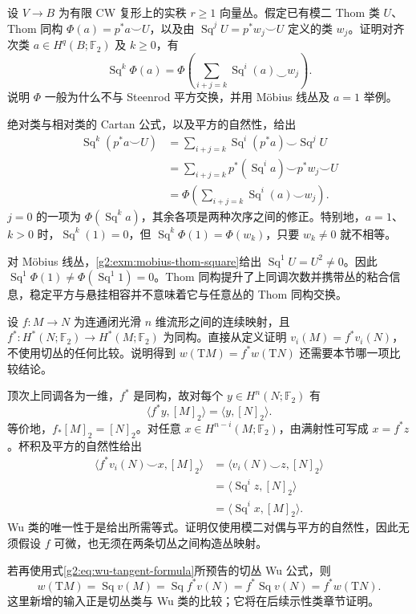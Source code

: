 \begin{exercise}\label{g2:ex:thom-square-module-correction}
	设 \(V\to B\) 为有限 CW 复形上的实秩 \(r\ge1\) 向量丛。假定已有模二 Thom 类 \(U\)、Thom 同构 \(\Phi(a)=p^*a\smile U\)，以及由 \(\operatorname{Sq}^jU=p^*w_j\smile U\) 定义的类 \(w_j\)。证明对齐次类 \(a\in H^q(B;\mathbb F_2)\) 及 \(k\ge0\)，有
	\[
		\operatorname{Sq}^k\Phi(a)=\Phi\!\left(\sum_{i+j=k}\operatorname{Sq}^i(a)\smile w_j\right).
	\]
	说明 \(\Phi\) 一般为什么不与 Steenrod 平方交换，并用 Möbius 线丛及 \(a=1\) 举例。
\end{exercise}
\begin{solution}
	绝对类与相对类的 Cartan 公式，以及平方的自然性，给出
	\begin{align*}
		\operatorname{Sq}^k(p^*a\smile U)
		&=\sum_{i+j=k}\operatorname{Sq}^i(p^*a)\smile\operatorname{Sq}^jU\\
		&=\sum_{i+j=k}p^*(\operatorname{Sq}^i a)\smile p^*w_j\smile U\\
		&=\Phi\!\left(\sum_{i+j=k}\operatorname{Sq}^i(a)\smile w_j\right).
	\end{align*}
	\(j=0\) 的一项为 \(\Phi(\operatorname{Sq}^k a)\)，其余各项是两种次序之间的修正。特别地，\(a=1\)、\(k>0\) 时，\(\operatorname{Sq}^k(1)=0\)，但 \(\operatorname{Sq}^k\Phi(1)=\Phi(w_k)\)，只要 \(w_k\ne0\) 就不相等。

	对 Möbius 线丛，\cref{g2:exm:mobius-thom-square}给出 \(\operatorname{Sq}^1U=U^2\ne0\)。因此 \(\operatorname{Sq}^1\Phi(1)\ne\Phi(\operatorname{Sq}^1 1)=0\)。Thom 同构提升了上同调次数并携带丛的粘合信息，稳定平方与悬挂相容并不意味着它与任意丛的 Thom 同构交换。
\end{solution}

\begin{exercise}\label{g2:ex:wu-pullback-cohomology-equivalence}
	设 \(f:M\to N\) 为连通闭光滑 \(n\) 维流形之间的连续映射，且 \(f^*:H^*(N;\mathbb F_2)\to H^*(M;\mathbb F_2)\) 为同构。直接从定义证明 \(v_i(M)=f^*v_i(N)\)，不使用切丛的任何比较。说明得到 \(w(\mathrm TM)=f^*w(\mathrm TN)\) 还需要本节哪一项比较结论。
\end{exercise}
\begin{solution}
	顶次上同调各为一维，\(f^*\) 是同构，故对每个 \(y\in H^n(N;\mathbb F_2)\) 有
	\[
		\langle f^*y,[M]_2\rangle=\langle y,[N]_2\rangle.
	\]
	等价地，\(f_*[M]_2=[N]_2\)。对任意 \(x\in H^{n-i}(M;\mathbb F_2)\)，由满射性可写成 \(x=f^*z\)。杯积及平方的自然性给出
	\begin{align*}
		\langle f^*v_i(N)\smile x,[M]_2\rangle
		&=\langle v_i(N)\smile z,[N]_2\rangle\\
		&=\langle\operatorname{Sq}^i z,[N]_2\rangle\\
		&=\langle\operatorname{Sq}^i x,[M]_2\rangle.
	\end{align*}
	Wu 类的唯一性于是给出所需等式。证明仅使用模二对偶与平方的自然性，因此无须假设 \(f\) 可微，也无须在两条切丛之间构造丛映射。

	若再使用式\eqref{g2:eq:wu-tangent-formula}所预告的切丛 Wu 公式，则
	\[
		w(\mathrm TM)=\operatorname{Sq}v(M)=\operatorname{Sq}f^*v(N)=f^*\operatorname{Sq}v(N)=f^*w(\mathrm TN).
	\]
	这里新增的输入正是切丛类与 Wu 类的比较；它将在后续示性类章节证明。
\end{solution}

